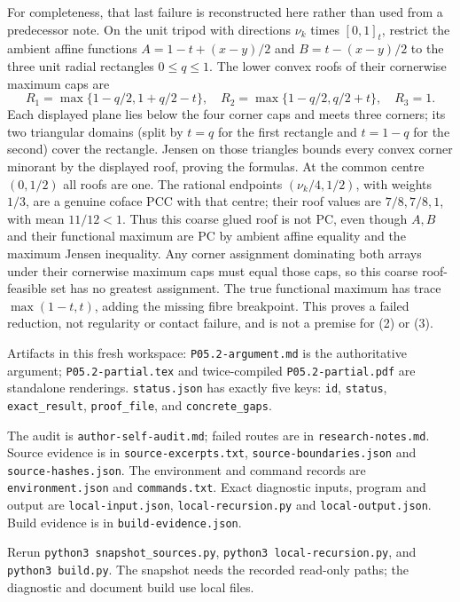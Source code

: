 \documentclass[
  11pt,
]{article}
\begin{document}
For completeness, that last failure is reconstructed here rather than
used from a predecessor note. On the unit tripod with directions
\(\nu_k\) times \([0,1]_t\), restrict the ambient affine functions
\(A=1-t+(x-y)/2\) and \(B=t-(x-y)/2\) to the three unit radial
rectangles \(0\leq q\leq1\). The lower convex roofs of their cornerwise
maximum caps are \[
 R_1=\max\{1-q/2,1+q/2-t\},\quad
 R_2=\max\{1-q/2,q/2+t\},\quad R_3=1.
\] Each displayed plane lies below the four corner caps and meets three
corners; its two triangular domains (split by \(t=q\) for the first
rectangle and \(t=1-q\) for the second) cover the rectangle. Jensen on
those triangles bounds every convex corner minorant by the displayed
roof, proving the formulas. At the common centre \((0,1/2)\) all roofs
are one. The rational endpoints \((\nu_k/4,1/2)\), with weights \(1/3\),
are a genuine coface PCC with that centre; their roof values are
\(7/8,7/8,1\), with mean \(11/12<1\). Thus this coarse glued roof is not
PC, even though \(A,B\) and their functional maximum are PC by ambient
affine equality and the maximum Jensen inequality. Any corner assignment
dominating both arrays under their cornerwise maximum caps must equal
those caps, so this coarse roof-feasible set has no greatest assignment.
The true functional maximum has trace \(\max(1-t,t)\), adding the
missing fibre breakpoint. This proves a failed reduction, not regularity
or contact failure, and is not a premise for (2) or (3).

Artifacts in this fresh workspace: \texttt{P05.2-argument.md} is the
authoritative argument; \texttt{P05.2-partial.tex} and twice-compiled
\texttt{P05.2-partial.pdf} are standalone renderings.
\texttt{status.json} has exactly five keys: \texttt{id},
\texttt{status}, \texttt{exact\_result}, \texttt{proof\_file}, and
\texttt{concrete\_gaps}.

The audit is \texttt{author-self-audit.md}; failed routes are in
\texttt{research-notes.md}. Source evidence is in
\texttt{source-excerpts.txt}, \texttt{source-boundaries.json} and
\texttt{source-hashes.json}. The environment and command records are
\texttt{environment.json} and \texttt{commands.txt}. Exact diagnostic
inputs, program and output are \texttt{local-input.json},
\texttt{local-recursion.py} and \texttt{local-output.json}. Build
evidence is in \texttt{build-evidence.json}.

Rerun \texttt{python3\ snapshot\_sources.py},
\texttt{python3\ local-recursion.py}, and \texttt{python3\ build.py}.
The snapshot needs the recorded read-only paths; the diagnostic and
document build use local files.
\end{document}
